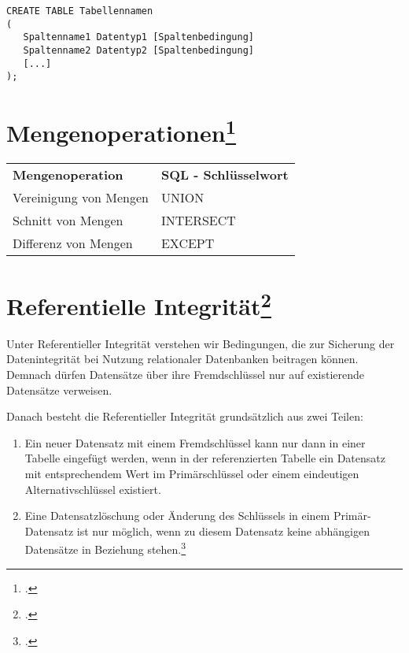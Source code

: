 \documentclass{bschlangaul-theorie}
\begin{document}
\begin{verbatim}
CREATE TABLE Tabellennamen
(
   Spaltenname1 Datentyp1 [Spaltenbedingung]
   Spaltenname2 Datentyp2 [Spaltenbedingung]
   [...]
);
\end{verbatim}

%

\section{Mengenoperationen\footcite[Seite 157]{winter}}

\noindent
\begin{tabular}{ll}
\textbf{Mengenoperation} &
\textbf{SQL - Schlüsselwort} \\

Vereinigung von Mengen &
UNION \\

Schnitt von Mengen &
INTERSECT \\

Differenz von Mengen &
EXCEPT \\
\end{tabular}

%

\section{Referentielle Integrität\footcite[Seite 14]{db:fs:3}}

Unter Referentieller Integrität verstehen wir Bedingungen, die zur
Sicherung der Datenintegrität bei Nutzung relationaler Datenbanken
beitragen können. Demnach dürfen Datensätze über ihre
Fremdschlüssel nur auf existierende Datensätze verweisen.

Danach besteht die Referentieller Integrität grundsätzlich aus zwei
Teilen:

\begin{enumerate}

\item Ein neuer Datensatz mit einem Fremdschlüssel kann nur dann in
einer Tabelle eingefügt werden, wenn in der referenzierten Tabelle ein
Datensatz mit entsprechendem Wert im Primärschlüssel oder einem
eindeutigen Alternativschlüssel existiert.

\item Eine Datensatzlöschung oder Änderung des Schlüssels in einem
Primär-Datensatz ist nur möglich, wenn zu diesem Datensatz keine
abhängigen Datensätze in Beziehung stehen.\footcite{wiki:referentielle-Integritaet}
\end{enumerate}
\end{document}

